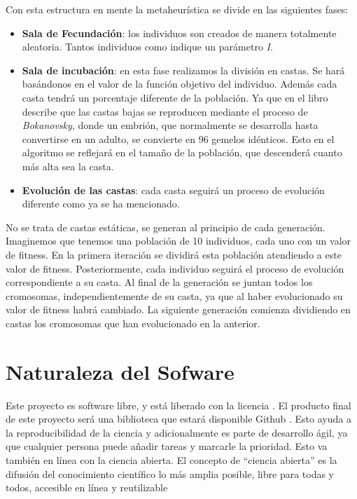 Con esta estructura en mente la metaheurística se divide en las siguientes fases:

\begin{itemize}
    \item \textbf{Sala de Fecundación}: los individuos son creados de manera totalmente aleatoria. Tantos individuos
    como indique un parámetro \textit{I}.
    \item \textbf{Sala de incubación}: en esta fase realizamos la división en castas. Se hará basándonos en el valor de
    la función objetivo del individuo. Además cada casta tendrá un porcentaje diferente de la población. Ya que en el libro
    describe que las castas bajas se reproducen mediante el proceso de \textit{Bokanovsky}, donde un embrión, que normalmente 
    se desarrolla hasta convertirse en un adulto, se convierte en 96 gemelos idénticos. Esto en el algoritmo se reflejará 
    en el tamaño de la población, que descenderá cuanto más alta sea la casta.    
    \item \textbf{Evolución de las castas}: cada casta seguirá un proceso de evolución diferente como ya se 
    ha mencionado.
\end{itemize}

No se trata de castas estáticas, se generan al principio de cada generación. Imaginemos que tenemos una población de 10 individuos, cada 
uno con un valor de fitness. En la primera iteración se dividirá esta población atendiendo a este valor de fitness. Posteriormente,
cada individuo seguirá el proceso de evolución correspondiente a su casta. Al final de la generación se juntan todos los cromosomas,
independientemente de su casta, ya que al haber evolucionado su valor de fitness habrá cambiado. La siguiente generación comienza
dividiendo en castas los cromosomas que han evolucionado en la anterior.

\section{Naturaleza del Sofware}

Este proyecto es software libre, y está liberado con la licencia \cite{gplv3}. El producto final de este proyecto será una
biblioteca que estará disponible Github \cite{project_repository}. Esto ayuda a la reproducibilidad de la ciencia y 
adicionalmente es parte de desarrollo ágil, ya que cualquier persona puede añadir tareas y marcarle la prioridad. Esto va 
también en línea con la ciencia abierta. El concepto de “ciencia abierta” es la difusión del conocimiento científico 
lo más amplia posible, libre para todas y todos, accesible en línea y reutilizable
